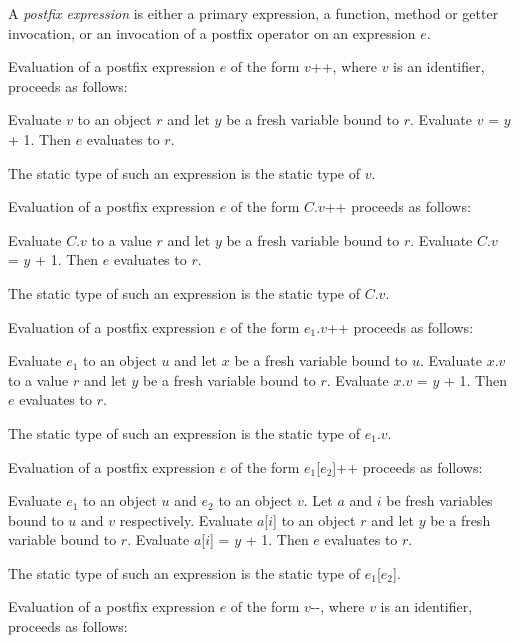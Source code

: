 \documentclass{article}
\newcommand{\code}[1]{{\sf #1}}
\begin{document}
\LMHash{}
 A {\em postfix expression} is either a primary expression, a function, method or getter invocation, or an invocation of a postfix operator on an expression $e$.

\LMHash{}
Evaluation of a postfix expression $e$ of the form \code{$v$++}, where $v$ is an identifier, proceeds as follows:

\LMHash{}
Evaluate $v$ to an object $r$ and let $y$ be a fresh variable bound to $r$.
Evaluate \code{$v$ = $y$ + 1}.
Then $e$ evaluates to $r$.

\LMHash{}
The static type of such an expression is the static type of $v$.


\LMHash{}
Evaluation of a postfix expression $e$ of the form \code{$C$.$v$++}
proceeds as follows:

\LMHash{}
Evaluate \code{$C$.$v$} to a value $r$
and let $y$ be a fresh variable bound to $r$.
Evaluate \code{$C$.$v$ = $y$ + 1}.
Then $e$ evaluates to $r$.

\LMHash{}
The static type of such an expression is the static type of \code{$C$.$v$}.


\LMHash{}
Evaluation of a postfix expression $e$ of the form \code{$e_1$.$v$++}
proceeds as follows:

\LMHash{}
Evaluate $e_1$ to an object $u$ and let $x$ be a fresh variable bound to $u$.
Evaluate \code{$x$.$v$} to a value $r$
and let $y$ be a fresh variable bound to $r$.
Evaluate \code{$x$.$v$ = $y$ + 1}.
Then $e$ evaluates to $r$.

\LMHash{}
The static type of such an expression is the static type of \code{$e_1$.$v$}.


\LMHash{}
Evaluation of a postfix expression $e$ of the form \code{$e_1$[$e_2$]++}
proceeds as follows:

\LMHash{}
Evaluate $e_1$ to an object $u$ and $e_2$ to an object $v$.
Let $a$ and $i$ be fresh variables bound to $u$ and $v$ respectively.
Evaluate \code{$a$[$i$]} to an object $r$
and let $y$ be a fresh variable bound to $r$.
Evaluate \code{$a$[$i$] = $y$ + 1}.
Then $e$ evaluates to $r$.

\LMHash{}
The static type of such an expression is the static type of \code{$e_1$[$e_2$]}.


\LMHash{}
Evaluation of a postfix expression $e$ of the form \code{$v$-{}-}, where $v$ is an identifier, proceeds as follows:
\end{document}
